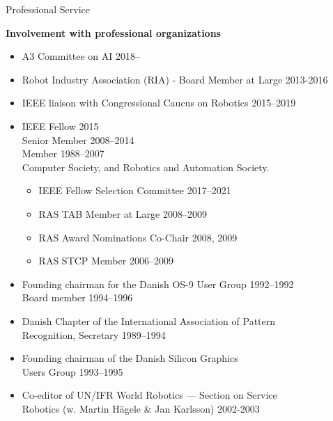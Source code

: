 \documentclass{article}
\begin{document}
\begin{cv}
\begin{cvlist}{Professional Service}
\item {\bf Involvement with professional organizations}
  \begin{itemize}
  \item A3 Committee on AI \cftdotfill{\cftdotsep} 2018--
  \item Robot Industry Association (RIA) - Board Member at Large
    \cftdotfill{\cftdotsep} 2013-2016
  \item IEEE liaison with Congressional Caucus on Robotics
    \cftdotfill{\cftdotsep}  2015--2019
  \item IEEE Fellow \cftdotfill{\cftdotsep} 2015\\
    Senior Member   \cftdotfill{\cftdotsep} 2008--2014\\
    Member \cftdotfill{\cftdotsep}    1988--2007\\
    Computer Society, and Robotics and Automation Society.
    \begin{itemize}
    \item IEEE Fellow Selection Committee \cftdotfill{\cftdotsep} 2017--2021
    \item RAS TAB Member at Large \cftdotfill{\cftdotsep} 2008--2009
    \item RAS Award Nominations Co-Chair \cftdotfill{\cftdotsep} 2008,
      2009
    \item RAS STCP Member \cftdotfill{\cftdotsep} 2006--2009
    \end{itemize}
  \item Founding chairman for the Danish OS-9 User Group
    \cftdotfill{\cftdotsep} 1992--1992\\ Board member
    \cftdotfill{\cftdotsep} 1994--1996
  \item Danish Chapter of the International Association of
    Pattern\\ Recognition, Secretary \cftdotfill{\cftdotsep}
    1989--1994
  \item Founding chairman of the Danish Silicon Graphics \\Users Group
    \cftdotfill{\cftdotsep} 1993--1995
  \item Co-editor of UN/IFR World Robotics --- Section on
    Service\\ Robotics (w. Martin H\"agele \& Jan Karlsson)
    \cftdotfill{\cftdotsep} 2002-2003
  \end{itemize}


\end{cvlist}
\end{cv}
\end{document}
